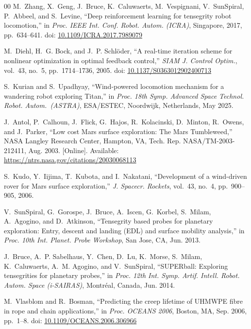 \documentclass[conference]{IEEEtran}
\begin{document}
{\begin{thebibliography}{00}
M.~Zhang, X.~Geng, J.~Bruce, K.~Caluwaerts, M.~Vespignani,
V.~SunSpiral, P.~Abbeel, and S.~Levine,
``Deep reinforcement learning for tensegrity robot locomotion,''
in \textit{Proc. IEEE Int. Conf. Robot. Autom. (ICRA)},
Singapore, 2017, pp.~634--641.
doi: \href{https://doi.org/10.1109/ICRA.2017.7989079}{10.1109/ICRA.2017.7989079}

M.~Diehl, H.~G. Bock, and J.~P. Schl\"{o}der,
``A real-time iteration scheme for nonlinear optimization in optimal
feedback control,''
\textit{SIAM J. Control Optim.}, vol.~43, no.~5, pp.~1714--1736, 2005.
doi: \href{https://doi.org/10.1137/S0363012902400713}{10.1137/S0363012902400713}

S.~Kurian and S.~Upadhyay,
``Wind-powered locomotion mechanism for a wandering robot exploring {Titan},''
in \textit{Proc. 18th Symp. Advanced Space Technol. Robot. Autom.\ (ASTRA)},
ESA/ESTEC, Noordwijk, Netherlands, May 2025.

J.~Antol, P.~Calhoun, J.~Flick, G.~Hajos, R.~Kolacinski,
D.~Minton, R.~Owens, and J.~Parker,
``Low cost {Mars} surface exploration: {The Mars Tumbleweed},''
NASA Langley Research Center, Hampton, VA,
Tech. Rep. NASA/TM-2003-212411, Aug. 2003.
[Online]. Available: \url{https://ntrs.nasa.gov/citations/20030068113}

S.~Kudo, Y.~Iijima, T.~Kubota, and I.~Nakatani,
``Development of a wind-driven rover for {Mars} surface exploration,''
\textit{J. Spacecr. Rockets}, vol.~43, no.~4, pp.~900--905, 2006.

V.~SunSpiral, G.~Gorospe, J.~Bruce, A.~Iscen, G.~Korbel, S.~Milam,
A.~Agogino, and D.~Atkinson,
``Tensegrity based probes for planetary exploration: {Entry}, descent and
landing ({EDL}) and surface mobility analysis,''
in \textit{Proc. 10th Int. Planet. Probe Workshop},
San Jose, CA, Jun. 2013.

J.~Bruce, A.~P. Sabelhaus, Y.~Chen, D.~Lu, K.~Morse,
S.~Milam, K.~Caluwaerts, A.~M. Agogino, and V.~SunSpiral,
``{SUPERball}: Exploring tensegrities for planetary probes,''
in \textit{Proc. 12th Int. Symp. Artif. Intell. Robot. Autom. Space
(i-SAIRAS)},
Montr\'{e}al, Canada, Jun. 2014.

M.~Vlasblom and R.~Bosman,
``Predicting the creep lifetime of {UHMWPE} fibre in rope and
chain applications,''
in \textit{Proc. OCEANS 2006},
Boston, MA, Sep. 2006, pp.~1--8.
doi: \href{https://doi.org/10.1109/OCEANS.2006.306966}{10.1109/OCEANS.2006.306966}


\end{thebibliography}}
\end{document}
